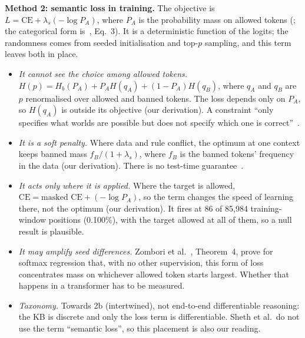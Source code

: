 \documentclass[letterpaper, 10pt, conference]{IEEEtran}
\begin{document}
\textbf{Method 2: semantic loss in training.} The objective is $L=\mathrm{CE}+\lambda_s(-\log P_A)$, where $P_A$ is the probability mass on allowed tokens (\cite{xu2018}; the categorical form is~\cite{ahmed2023}, Eq.~3). It is a deterministic function of the logits; the randomness comes from seeded initialisation and top-$p$ sampling, and this term leaves both in place.
\begin{itemize}
\item \emph{It cannot see the choice among allowed tokens.} $H(p)=H_b(P_A)+P_AH(q_A)+(1{-}P_A)H(q_B)$, where $q_A$ and $q_B$ are $p$ renormalised over allowed and banned tokens. The loss depends only on $P_A$, so $H(q_A)$ is outside its objective (our derivation). A constraint ``only specifies what worlds are possible but does not specify which one is correct''~\cite{vankrieken}.
\item \emph{It is a soft penalty.} Where data and rule conflict, the optimum at one context keeps banned mass $f_B/(1+\lambda_s)$, where $f_B$ is the banned tokens' frequency in the data (our derivation). There is no test-time guarantee~\cite{ahmed2022}.
\item \emph{It acts only where it is applied.} Where the target is allowed, $\mathrm{CE}=\text{masked CE}+(-\log P_A)$, so the term changes the speed of learning there, not the optimum (our derivation). It fires at 86 of 85,984 training-window positions (0.100\%), with the target allowed at all of them, so a null result is plausible.
\item \emph{It may amplify seed differences.} Zombori et al.~\cite{zombori}, Theorem~4, prove for softmax regression that, with no other supervision, this form of loss concentrates mass on whichever allowed token starts largest. Whether that happens in a transformer has to be measured.
\item \emph{Taxonomy.} Towards 2b (intertwined), not end-to-end differentiable reasoning: the KB is discrete and only the loss term is differentiable. Sheth et al.\ do not use the term ``semantic loss'', so this placement is also our reading.
\end{itemize}
\end{document}
